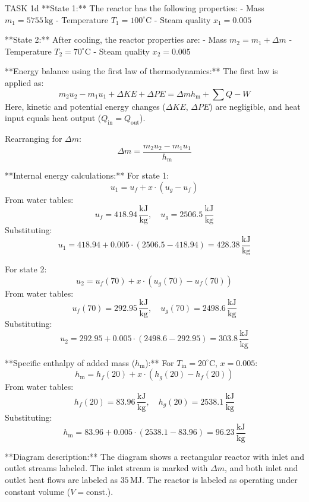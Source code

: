 TASK 1d  
**State 1:**  
The reactor has the following properties:  
- Mass \( m_1 = 5755 \, \text{kg} \)  
- Temperature \( T_1 = 100^\circ\text{C} \)  
- Steam quality \( x_1 = 0.005 \)  

**State 2:**  
After cooling, the reactor properties are:  
- Mass \( m_2 = m_1 + \Delta m \)  
- Temperature \( T_2 = 70^\circ\text{C} \)  
- Steam quality \( x_2 = 0.005 \)  

**Energy balance using the first law of thermodynamics:**  
The first law is applied as:  
\[
m_2 u_2 - m_1 u_1 + \Delta KE + \Delta PE = \Delta m h_{\text{m}} + \sum Q - W
\]  
Here, kinetic and potential energy changes (\( \Delta KE \), \( \Delta PE \)) are negligible, and heat input equals heat output (\( Q_{\text{in}} = Q_{\text{out}} \)).  

Rearranging for \( \Delta m \):  
\[
\Delta m = \frac{m_2 u_2 - m_1 u_1}{h_{\text{m}}}
\]  

**Internal energy calculations:**  
For state 1:  
\[
u_1 = u_f + x \cdot (u_g - u_f)
\]  
From water tables:  
\[
u_f = 418.94 \, \frac{\text{kJ}}{\text{kg}}, \quad u_g = 2506.5 \, \frac{\text{kJ}}{\text{kg}}
\]  
Substituting:  
\[
u_1 = 418.94 + 0.005 \cdot (2506.5 - 418.94) = 428.38 \, \frac{\text{kJ}}{\text{kg}}
\]  

For state 2:  
\[
u_2 = u_f(70) + x \cdot (u_g(70) - u_f(70))
\]  
From water tables:  
\[
u_f(70) = 292.95 \, \frac{\text{kJ}}{\text{kg}}, \quad u_g(70) = 2498.6 \, \frac{\text{kJ}}{\text{kg}}
\]  
Substituting:  
\[
u_2 = 292.95 + 0.005 \cdot (2498.6 - 292.95) = 303.8 \, \frac{\text{kJ}}{\text{kg}}
\]  

**Specific enthalpy of added mass (\( h_{\text{m}} \)):**  
For \( T_{\text{in}} = 20^\circ\text{C} \), \( x = 0.005 \):  
\[
h_{\text{m}} = h_f(20) + x \cdot (h_g(20) - h_f(20))
\]  
From water tables:  
\[
h_f(20) = 83.96 \, \frac{\text{kJ}}{\text{kg}}, \quad h_g(20) = 2538.1 \, \frac{\text{kJ}}{\text{kg}}
\]  
Substituting:  
\[
h_{\text{m}} = 83.96 + 0.005 \cdot (2538.1 - 83.96) = 96.23 \, \frac{\text{kJ}}{\text{kg}}
\]  

**Diagram description:**  
The diagram shows a rectangular reactor with inlet and outlet streams labeled. The inlet stream is marked with \( \Delta m \), and both inlet and outlet heat flows are labeled as \( 35 \, \text{MJ} \). The reactor is labeled as operating under constant volume (\( V = \text{const.} \)).